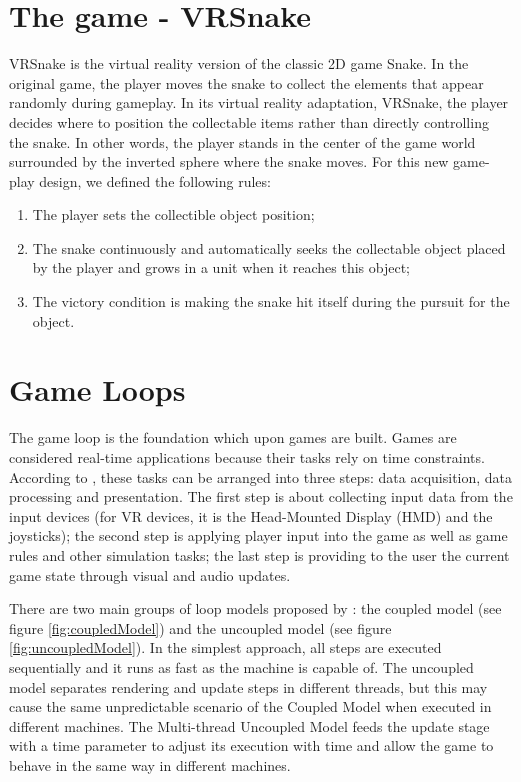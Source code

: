 \documentclass[runningheads]{llncs}
\begin{document}


\section{The game - VRSnake} \label{sec:vrsnake}
VRSnake is the virtual reality version of the classic 2D game Snake.
In the original game, the player moves the snake to collect the elements that appear randomly during gameplay. In its virtual reality adaptation, VRSnake, the player decides where to position the collectable items rather than directly controlling the snake. In other words, the player stands in the center of the game world surrounded by the inverted sphere where the snake moves. 
For this new game-play design, we defined the following rules:

\begin{enumerate}
\item The player sets the collectible object position;
\item The snake continuously and automatically seeks the collectable object placed by the player and grows in a unit when it reaches this object;
\item The victory condition is making the snake hit itself during the pursuit for the object.
\end{enumerate}

\section{Game Loops}
The game loop is the foundation which upon games are built. Games are considered real-time applications because their tasks rely on time constraints. According to \cite{GameArchitecture2009}, these tasks can be arranged into three steps: data acquisition, data processing and presentation. The first step is about collecting input data from the input devices (for VR devices, it is the Head-Mounted Display (HMD) and the joysticks); the second step is applying player input into the game as well as game rules and other simulation tasks; the last step is providing to the user the current game state through visual and audio updates. 

There are two main groups of loop models proposed by \cite{valente_conci_feijo}: the coupled model (see figure \ref{fig:coupledModel}) and the uncoupled model (see figure \ref{fig:uncoupledModel}).
In the simplest approach, all steps are executed sequentially and it runs as fast as the machine is capable of. The uncoupled model separates rendering and update steps in different threads, but this may cause the same unpredictable scenario of the Coupled Model when executed in different machines. The Multi-thread Uncoupled Model feeds the update stage with a time parameter to adjust its execution with time and allow the game to behave in the same way in different machines.  
\end{document}
